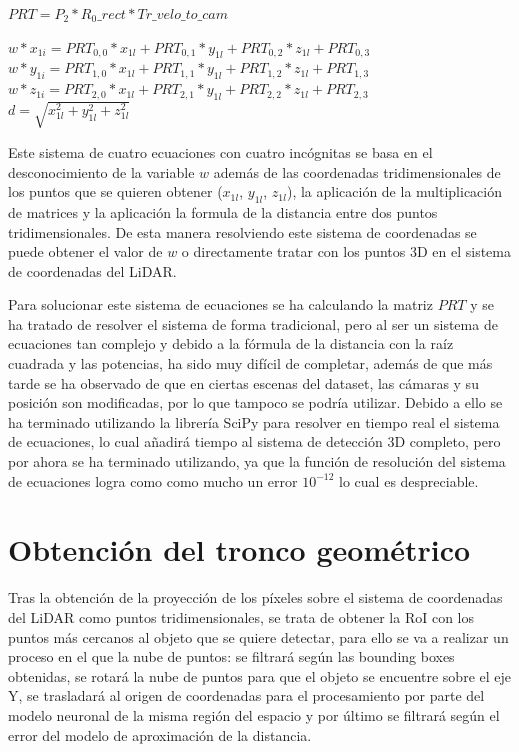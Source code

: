 \begin{center}
$PRT = P_2 * R_0\_rect * Tr\_velo\_to\_cam$
\end{center}

\begin{center}
$w * x_{1i} = PRT_{0,0} * x_{1l} + PRT_{0,1} * y_{1l} + PRT_{0,2} * z_{1l} + PRT_{0,3}$\\
$w * y_{1i} = PRT_{1,0} * x_{1l} + PRT_{1,1} * y_{1l} + PRT_{1,2} * z_{1l} + PRT_{1,3}$\\
$w * z_{1i} = PRT_{2,0} * x_{1l} + PRT_{2,1} * y_{1l} + PRT_{2,2} * z_{1l} + PRT_{2,3}$\\
$d = \sqrt{x_{1l}^2 + y_{1l}^2 + z_{1l}^2}$
\end{center}

Este sistema de cuatro ecuaciones con cuatro incógnitas se basa en el desconocimiento de la variable $w$ además de las coordenadas tridimensionales de los puntos que se quieren obtener ($x_{1l}$, $y_{1l}$, $z_{1l}$), la aplicación de la multiplicación de matrices y la aplicación la formula de la distancia entre dos puntos tridimensionales. De esta manera resolviendo este sistema de coordenadas se puede obtener el valor de $w$ o directamente tratar con los puntos 3D en el sistema de coordenadas del \ac{LiDAR}.

Para solucionar este sistema de ecuaciones se ha calculando la matriz $PRT$ y se ha tratado de resolver el sistema de forma tradicional, pero al ser un sistema de ecuaciones tan complejo y debido a la fórmula de la distancia con la raíz cuadrada y las potencias, ha sido muy difícil de completar, además de que más tarde se ha observado de que en ciertas escenas del dataset, las cámaras y su posición son modificadas, por lo que tampoco se podría utilizar. Debido a ello se ha terminado utilizando la librería SciPy para resolver en tiempo real el sistema de ecuaciones, lo cual añadirá tiempo al sistema de detección 3D completo, pero por ahora se ha terminado utilizando, ya que la función de resolución del sistema de ecuaciones logra como como mucho un error $10^{-12}$ lo cual es despreciable.

\section{Obtención del tronco geométrico}
\label{sec:Obtención del tronco geométrico}

Tras la obtención de la proyección de los píxeles sobre el sistema de coordenadas del \ac{LiDAR} como puntos tridimensionales, se trata de obtener la \ac{RoI} con los puntos más cercanos al objeto que se quiere detectar, para ello se va a realizar un proceso en el que la nube de puntos: se filtrará según las bounding boxes obtenidas, se rotará la nube de puntos para que el objeto se encuentre sobre el eje Y, se trasladará al origen de coordenadas para el procesamiento por parte del modelo neuronal de la misma región del espacio y por último se filtrará según el error del modelo de aproximación de la distancia.

